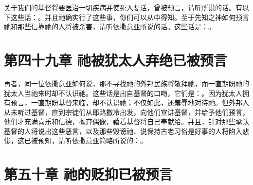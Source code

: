 关于我们的基督将要医治一切疾病并使死人复活，曾被预言，请听所说的话。有以下这些话：。并且祂确实行了这些事，你们可以从中得知。至于先知之神如何预言祂和那些信靠祂的人将被杀害，请听依撒意亚所说的话。这些话是：。\par


\section{第四十九章 祂被犹太人弃绝已被预言}

再者，同一位依撒意亚如何说，那不寻找祂的外邦民族将敬拜祂，而一直期盼祂的犹太人当祂来时却不认识祂。这些话是出自基督的口吻，它们是：。因为犹太人拥有预言，一直期盼基督来临，却不认识祂；不仅如此，还羞辱地对待祂。但外邦人从未听过基督，直到宗徒们从耶路撒冷出发，向他们宣讲基督，并给予他们预言，他们才充满喜乐和信德，抛弃偶像，藉着基督将自己奉献给。并且，针对那些承认基督的人将说出这些恶言，以及那些毁谤祂、说保持古老习俗是好事的人将陷入悲惨，这已被预知，请听依撒意亚简略所说的：。\par


\section{第五十章 祂的贬抑已被预言}

